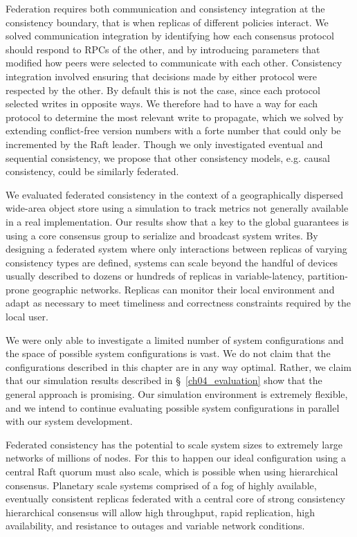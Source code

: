 Federation requires both communication and consistency integration at the consistency boundary, that is when replicas of different policies interact.
We solved communication integration by identifying how each consensus protocol should respond to RPCs of the other, and by introducing parameters that modified how peers were selected to communicate with each other.
Consistency integration involved ensuring that decisions made by either protocol were respected by the other.
By default this is not the case, since each protocol selected writes in opposite ways.
We therefore had to have a way for each protocol to determine the most relevant write to propagate, which we solved by extending conflict-free version numbers with a forte number that could only be incremented by the Raft leader.
Though we only investigated eventual and sequential consistency, we propose that other consistency models, e.g. causal consistency, could be similarly federated.

We evaluated federated consistency in the context of a geographically dispersed wide-area object store using a simulation to track metrics not generally available in a real implementation.
Our results show that a key to the global guarantees is using a core consensus group to serialize and broadcast system writes.
By designing a federated system where only interactions between replicas of varying consistency types are defined, systems can scale beyond the handful of devices usually described to dozens or hundreds of replicas in variable-latency, partition-prone geographic networks.
Replicas can monitor their local environment and adapt as necessary to meet timeliness and correctness constraints required by the local user.

We were only able to investigate a limited number of system configurations and the space of possible system configurations is vast.
We do not claim that the configurations described in this chapter are in any way optimal.
Rather, we claim that our simulation results described in \S~\ref{ch04_evaluation} show that the general approach is promising.
Our simulation environment is extremely flexible, and we intend to continue
evaluating possible system configurations in parallel with our system development.

Federated consistency has the potential to scale system sizes to extremely large networks of millions of nodes.
For this to happen our ideal configuration using a central Raft quorum must also scale, which is possible when using hierarchical consensus.
Planetary scale systems comprised of a fog of highly available, eventually consistent replicas federated with a central core of strong consistency hierarchical consensus will allow high throughput, rapid replication, high availability, and resistance to outages and variable network conditions.
